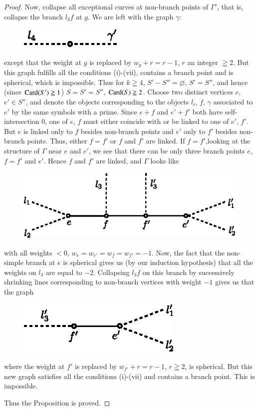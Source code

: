 \begin{proof}
Now, collapse all exceptional curves at non-branch points of $\Gamma'$, that is, collapse the branch $l_3f$ at $g$. We are left with the graph $\gamma$:
\begin{figure}[H]
\centering
\includegraphics{fig22.eps}
\end{figure}
\noindent
except that the weight at $g$ is replaced by $w_g + r = r -1$, $r$ an integer $\geqq 2$. But this graph fulfills all the conditions (i)-(vii), contains a branch point and is spherical, which is impossible. Thus for $k \geqq 4$, $S'-S'' = \varnothing$, $S' = S''$, and hence (since $\operatorname{Card} (S') \geqq 1$) $S = S' = S''$, $\operatorname{Card} (S) \geqq 2$. Choose two distinct vertices $e$, $e' \in S''$, and denote the objects corresponding to the objects $l_i$, $f$, $\gamma$ associated to $e'$ by the same symbols with a prime. Since $e +f$ and $e'+ f'$ both have self-intersection 0, one of $e$, $f$ must either coincide with or be linked to one of $e'$, $f'$. But $e$ is linked only to $f$ besides non-branch points and $e'$ only to $f'$ besides non-branch points. Thus, either $f = f'$ or $f$ and $f'$ are linked. If $f=f'$,\pageoriginale looking at the structure of $\Gamma$ near $e$ and $e'$, we see that there can be only three branch points $e$, $f = f'$ and $e'$. Hence $f$ and $f'$ are linked, and $\Gamma$ looks like
\begin{figure}[H]
\centering
\includegraphics{fig23.eps}
\end{figure}
\noindent
with all weights $<0$, $w_e = w_{e'} = w_f = w_{f'} = -1$. Now, the fact that the non-simple branch at $e$ is spherical gives us (by our induction hypothesis) that all the weights on $l_3$ are equal to $-2$. Collapsing $l_3f$ on this branch by successively shrinking lines corresponding to non-branch vertices with weight $-1$ gives us that the graph
\begin{figure}[H]
\centering
\includegraphics{fig24.eps}
\end{figure}
\noindent
where the weight at $f'$ is replaced by $w_{f'} + r = r-1$, $r \geqq 2$, is spherical. But this new graph satisfies all the conditions (i)-(vii) and contains a branch point. This is impossible.

Thus the Proposition is proved.
\end{proof}

